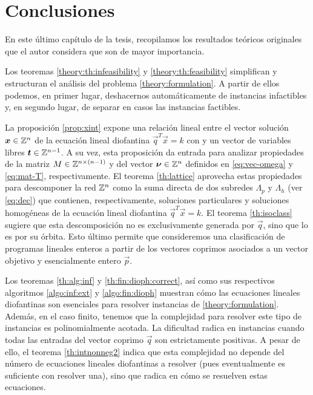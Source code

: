 \chapter{Conclusiones}
\noindent
En este último capítulo de la tesis, recopilamos los resultados teóricos originales que el autor
considera que son de mayor importancia.

Los teoremas \ref{theory:th:infeasibility} y \ref{theory:th:feasibility} simplifican y estructuran
el análisis del problema \eqref{theory:formulation}. A partir de ellos podemos, en primer lugar,
deshacernos automáticamente de instancias infactibles y, en segundo lugar, de separar en casos las
instancias factibles.

La proposición \ref{prop:xint} expone una relación lineal entre el vector solución $\boldsymbol{x} \in
\mathbb{Z}^n$ de la ecuación lineal diofantina $\vec{q}^T\vec{x} = k$ con y un vector de variables libres
$\boldsymbol{t} \in \mathbb{Z}^{n-1}$. A su vez, esta proposición da entrada para analizar propiedades de la matriz
$M \in \mathbb{Z}^{n \times (n - 1)}$ y del vector $\boldsymbol{\nu} \in \mathbb{Z}^n$ definidos en \eqref{eq:vec-omega} y
\eqref{eq:mat-T}, respectivamente. El teorema \ref{th:lattice} aprovecha estas propiedades para
descomponer la red $\mathbb{Z}^n$ como la suma directa de dos subredes $\Lambda_p$ y $\Lambda_h$ (ver
\eqref{eq:dec}) que contienen, respectivamente, soluciones particulares y soluciones homogéneas de
la ecuación lineal diofantina $\vec{q}^T\vec{x} = k$. El teorema \ref{th:isoclass} sugiere que esta
descomposición no es exclusivamente generada por $\vec{q}$, sino que lo es por su órbita. Esto
último permite que consideremos una clasificación de programas lineales enteros a partir de los
vectores coprimos asociados a un vector objetivo y esencialmente entero $\vec{p}$.

Los teoremas \ref{th:alg:inf} y \ref{th:fin:dioph:correct}, así como sus respectivos algoritmos
\ref{algo:inf:ext} y \ref{algo:fin:dioph} muestran cómo las ecuaciones lineales diofantinas son
esenciales para resolver instancias de \eqref{theory:formulation}. Además, en el caso finito,
tenemos que la complejidad para resolver este tipo de instancias es polinomialmente acotada. La
dificultad radica en instancias cuando todas las entradas del vector coprimo $\vec{q}$ son
estrictamente positivas. A pesar de ello, el teorema \ref{th:intnonneg2} indica que esta complejidad
no depende del número de ecuaciones lineales diofantinas a resolver (pues eventualmente es
suficiente con resolver una), sino que radica en cómo se resuelven estas ecuaciones.

